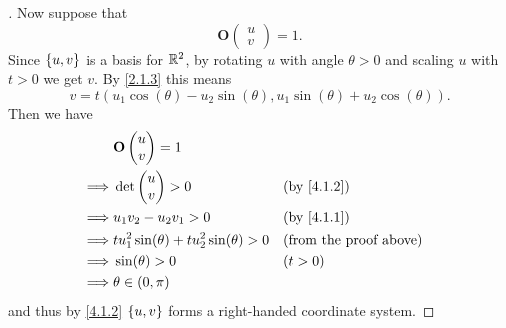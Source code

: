 \begin{proof}[]
  Now suppose that
  \[
    \mathbf{O}\begin{pmatrix}
      u \\
      v
    \end{pmatrix} = 1.
  \]
  Since \(\left\lbrace u, v\right\rbrace\) is a basis for \(\mathbb{R}^2\), by rotating \(u\) with angle \(\theta > 0\) and scaling \(u\) with \(t > 0\) we get \(v\).
  By \cref{2.1.3} this means
  \[
    v = t (u_1 \cos(\theta) - u_2 \sin(\theta), u_1 \sin(\theta) + u_2 \cos(\theta)).
  \]
  Then we have
  \begin{align*}
             & \mathbf{O}\begin{pmatrix}
                           u \\
                           v
                         \end{pmatrix} = 1                                                        \\
    \implies & \det\begin{pmatrix}
                     u \\
                     v
                   \end{pmatrix} > 0                             &  & \text{(by \cref{4.1.2})}    \\
    \implies & u_1 v_2 - u_2 v_1 > 0                           &  & \text{(by \cref{4.1.1})}      \\
    \implies & t u_1^2 \sin(\theta) + t u_2^2 \sin(\theta) > 0 &  & \text{(from the proof above)} \\
    \implies & \sin(\theta) > 0                                &  & (t > 0)                       \\
    \implies & \theta \in (0, \pi)
  \end{align*}
  and thus by \cref{4.1.2} \(\left\lbrace u, v\right\rbrace\) forms a right-handed coordinate system.
\end{proof}
